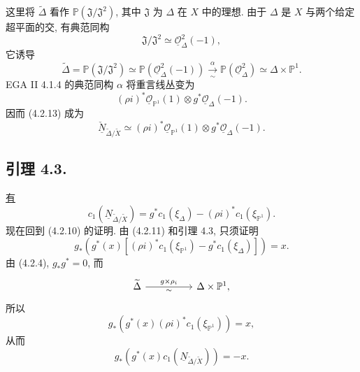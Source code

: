 这里将 $\widetilde\Delta$ 看作 $\mathbb P(\mathfrak J/\mathfrak J^2)$, 其中 $\mathfrak J$ 为 $\Delta$ 在 $X$ 中的理想. 由于 $\Delta$ 是 $X$ 与两个给定超平面的交, 有典范同构
\[
\mathfrak J/\mathfrak J^2\simeq
\underline{\mathcal O}_\Delta^{2}(-1),
\]
它诱导
\[
\widetilde\Delta=\mathbb P(\mathfrak J/\mathfrak J^2)
\simeq\mathbb P(\underline{\mathcal O}_\Delta^{2}(-1))
\xrightarrow[\sim]{\alpha}
\mathbb P(\underline{\mathcal O}_\Delta^{2})
\simeq\Delta\times\mathbb P^1.
\]
EGA II 4.1.4 的典范同构 $\alpha$ 将重言线丛变为
\[
(\rho i)^*\underline{\mathcal O}_{\mathbb P^1}(1)
\otimes g^*\underline{\mathcal O}_\Delta(-1).
\]
因而 (4.2.13) 成为
\begin{equation}\tag{4.2.14}
\underline{\check N}_{\widetilde\Delta/\widetilde X}
\simeq(\rho i)^*\underline{\mathcal O}_{\mathbb P^1}(1)
       \otimes g^*\underline{\mathcal O}_\Delta(-1).
\end{equation}

\subsection*{引理 4.3.}
\underline{有}
\[
c_1(\underline N_{\widetilde\Delta/\widetilde X})
=g^*c_1(\xi_\Delta)-(\rho i)^*c_1(\xi_{\mathbb P^1}).
\]
现在回到 (4.2.10) 的证明. 由 (4.2.11) 和引理 4.3, 只须证明
\[
g_*\!\left(g^*(x)\left[(\rho i)^*c_1(\xi_{\mathbb P^1})
                       -g^*c_1(\xi_\Delta)\right]\right)=x.
\]
由 (4.2.4), $g_*g^*=0$, 而
\[
\begin{tikzcd}[column sep=huge]
\widetilde\Delta\arrow[r,"g\times\rho_i","\sim"']
  &\Delta\times\mathbb P^1,
\end{tikzcd}
\]
所以
\begin{equation}\tag{4.3.1}
g_*\!\left(g^*(x)(\rho i)^*c_1(\xi_{\mathbb P^1})\right)=x,
\end{equation}
从而
\begin{equation}\tag{4.3.2}
g_*\!\left(g^*(x)c_1(\underline N_{\widetilde\Delta/\widetilde X})\right)
=-x.
\end{equation}

